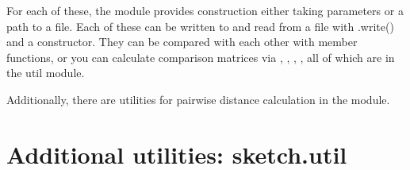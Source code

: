 \documentclass[letterpaper,10pt,english]{sphinxmanual}
\begin{document}
\sphinxAtStartPar
For each of these, the module provides construction \sphinxhyphen{} either taking parameters or a path to a file.
Each of these can be written to and read from a file with .write() and a constructor.
They can be compared with each other with member functions, or you can calculate comparison matrices via
, , , , all of which are in the util module.

\sphinxAtStartPar
Additionally, there are utilities for pairwise distance calculation in the  module.


\chapter{Additional utilities: sketch.util}
\end{document}

